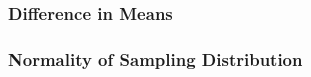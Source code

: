 \documentclass[handout]{beamer}
\newcommand{\blue}[1]{\textcolor{blue2}{#1}}
\newcommand{\xbar}{\overline{x}}
\begin{document}


\begin{frame}[fragile]
\frametitle{Difference in Means}
%
\end{frame}


\begin{frame}[fragile]
\frametitle{Normality of Sampling Distribution}
%
%
\end{frame}
\end{document}
